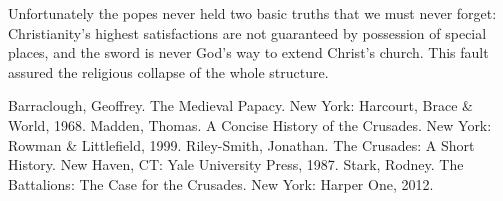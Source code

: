 Unfortunately the popes never held two basic truths that we must never forget: Christianity’s
highest satisfactions are not guaranteed by possession of special places, and the sword is never
God’s way to extend Christ’s church. This fault assured the religious collapse of the whole
structure.

\begin{readinglist}
\entry Barraclough, Geoffrey. The Medieval Papacy. New York: Harcourt, Brace \& World, 1968.
\entry Madden, Thomas. A Concise History of the Crusades. New York: Rowman \& Littlefield, 1999.
\entry Riley-Smith, Jonathan. The Crusades: A Short History. New Haven, CT: Yale University Press,
  1987.
\entry *Stark, Rodney. The Battalions: The Case for the Crusades. New York: Harper One, 2012.
\end{readinglist}
